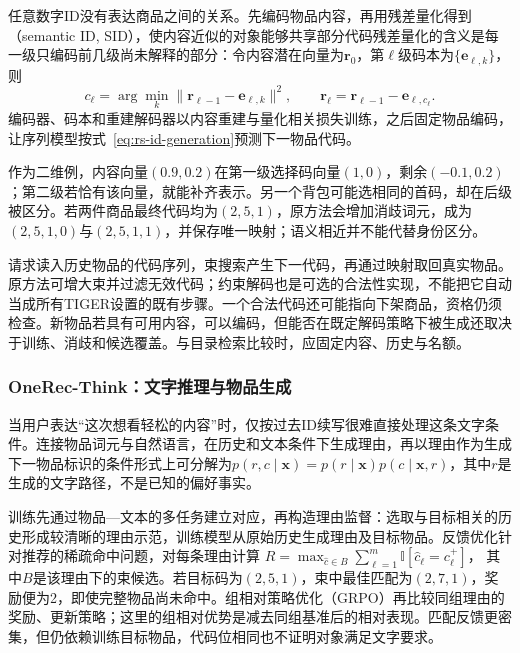 任意数字ID没有表达商品之间的关系。先编码物品内容，再用残差量化得到（semantic ID, SID），使内容近似的对象能够共享部分代码残差量化的含义是每一级只编码前几级尚未解释的部分：令内容潜在向量为$\bm r_0$，第$\ell$级码本为$\{\bm e_{\ell,k}\}$，则
\begin{equation}
 c_\ell=\arg\min_k\|\bm r_{\ell-1}-\bm e_{\ell,k}\|^2,\qquad
 \bm r_\ell=\bm r_{\ell-1}-\bm e_{\ell,c_\ell}.
 \label{eq:rs-tiger-rq}
\end{equation}
编码器、码本和重建解码器以内容重建与量化相关损失训练，之后固定物品编码，让序列模型按式~\eqref{eq:rs-id-generation}预测下一物品代码。

作为二维例，内容向量$(0.9,0.2)$在第一级选择码向量$(1,0)$，剩余$(-0.1,0.2)$；第二级若恰有该向量，就能补齐表示。另一个背包可能选相同的首码，却在后级被区分。若两件商品最终代码均为$(2,5,1)$，原方法会增加消歧词元，成为$(2,5,1,0)$与$(2,5,1,1)$，并保存唯一映射；语义相近并不能代替身份区分。

请求读入历史物品的代码序列，束搜索产生下一代码，再通过映射取回真实物品。原方法可增大束并过滤无效代码；约束解码也是可选的合法性实现，不能把它自动当成所有TIGER设置的既有步骤。一个合法代码还可能指向下架商品，资格仍须检查。新物品若具有可用内容，可以编码，但能否在既定解码策略下被生成还取决于训练、消歧和候选覆盖。与目录检索比较时，应固定内容、历史与名额。

\Needspace{110mm}
\subsubsection{OneRec-Think：文字推理与物品生成}
\label{sec:rs-onerec-think}

当用户表达“这次想看轻松的内容”时，仅按过去ID续写很难直接处理这条文字条件。连接物品词元与自然语言，在历史和文本条件下生成理由，再以理由作为生成下一物品标识的条件形式上可分解为$p(r,c\mid\bm x)=p(r\mid\bm x)p(c\mid\bm x,r)$，其中$r$是生成的文字路径，不是已知的偏好事实。

训练先通过物品—文本的多任务建立对应，再构造理由监督：选取与目标相关的历史形成较清晰的理由示范，训练模型从原始历史生成理由及目标物品。反馈优化针对推荐的稀疏命中问题，对每条理由计算
$R=\max_{\hat c\in B}\sum_{\ell=1}^m\mathbb I[\hat c_\ell=c_\ell^+]$，
其中$B$是该理由下的束候选。若目标码为$(2,5,1)$，束中最佳匹配为$(2,7,1)$，奖励便为2，即使完整物品尚未命中。组相对策略优化（GRPO）再比较同组理由的奖励、更新策略；这里的组相对优势是减去同组基准后的相对表现。匹配反馈更密集，但仍依赖训练目标物品，代码位相同也不证明对象满足文字要求。

